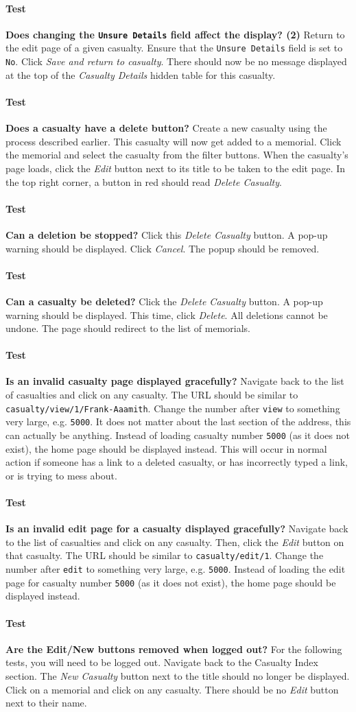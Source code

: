 \documentclass[12pt]{article}
\newcounter{Test}
\newcommand{\test}[1]{%
\stepcounter{Test}%
\paragraph{Test \theTest} \textbf{#1} }
\begin{document}
\test{Does changing the \texttt{Unsure Details} field affect the display? (2)}
Return to the edit page of a given casualty. Ensure that the \texttt{Unsure Details} field is set to \texttt{No}. Click \textit{Save and return to casualty}. There should now be no message displayed at the top of the \textit{Casualty Details} hidden table for this casualty.

\test{Does a casualty have a delete button?}
Create a new casualty using the process described earlier. This casualty will now get added to a memorial. Click the memorial and select the casualty from the filter buttons. When the casualty's page loads, click the \textit{Edit} button next to its title to be taken to the edit page. In the top right corner, a button in red should read \textit{Delete Casualty}.

\test{Can a deletion be stopped?}
Click this \textit{Delete Casualty} button. A pop-up warning should be displayed. Click \textit{Cancel}. The popup should be removed.

\test{Can a casualty be deleted?}
Click the \textit{Delete Casualty} button. A pop-up warning should be displayed. This time, click \textit{Delete}. All deletions cannot be undone. The page should redirect to the list of memorials.

\test{Is an invalid casualty page displayed gracefully?}
Navigate back to the list of casualties and click on any casualty. The URL should be similar to \texttt{casualty/view/1/Frank-Aaamith}. Change the number after \texttt{view} to something very large, e.g. \texttt{5000}. It does not matter about the last section of the address, this can actually be anything. Instead of loading casualty number \texttt{5000} (as it does not exist), the home page should be displayed instead. This will occur in normal action if someone has a link to a deleted casualty, or has incorrectly typed a link, or is trying to mess about.

\test{Is an invalid edit page for a casualty displayed gracefully?}
Navigate back to the list of casualties and click on any casualty. Then, click the \textit{Edit} button on that casualty. The URL should be similar to \texttt{casualty/edit/1}. Change the number after \texttt{edit} to something very large, e.g. \texttt{5000}. Instead of loading the edit page for casualty number \texttt{5000} (as it does not exist), the home page should be displayed instead.

\test{Are the Edit/New buttons removed when logged out?}
For the following tests, you will need to be logged out. Navigate back to the Casualty Index section. The \textit{New Casualty} button next to the title should no longer be displayed. Click on a memorial and click on any casualty. There should be no \textit{Edit} button next to their name.
\end{document}
